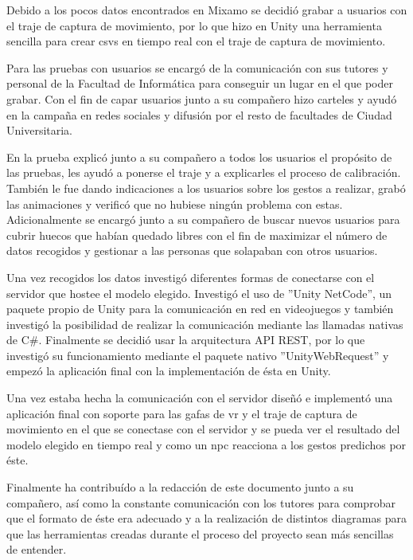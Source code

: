 Debido a los pocos datos encontrados en Mixamo se decidió grabar a usuarios con el traje de captura de movimiento, por lo que hizo en Unity una herramienta sencilla para crear \glspl{csv} en tiempo real con el traje de captura de movimiento.

Para las pruebas con usuarios se encargó de la comunicación con sus tutores y personal de la Facultad de Informática para conseguir un lugar en el que poder grabar.
Con el fin de capar usuarios junto a su compañero hizo carteles y ayudó en la campaña en redes sociales y difusión por el resto de facultades de Ciudad Universitaria.

En la prueba explicó junto a su compañero a todos los usuarios el propósito de las pruebas, les ayudó a ponerse el traje y a explicarles el proceso de calibración.
También le fue dando indicaciones a los usuarios sobre los gestos a realizar, grabó las animaciones y verificó que no hubiese ningún problema con estas.
Adicionalmente se encargó junto a su compañero de buscar nuevos usuarios para cubrir huecos que habían quedado libres con el fin de maximizar el número de datos recogidos y gestionar a las personas que solapaban con otros usuarios.

Una vez recogidos los datos investigó diferentes formas de conectarse con el servidor que hostee el modelo elegido.
Investigó el uso de ''Unity NetCode'', un paquete propio de Unity para la comunicación en red en videojuegos y también investigó la posibilidad de realizar la comunicación mediante las llamadas nativas de C\#.
Finalmente se decidió usar la arquitectura \gls{API REST}, por lo que investigó su funcionamiento mediante el paquete nativo ''UnityWebRequest'' y empezó la aplicación final con la implementación de ésta en Unity.

Una vez estaba hecha la comunicación con el servidor diseñó e implementó una aplicación final con soporte para las gafas de \gls{vr} y el traje de captura de movimiento en el que se conectase con el servidor y se pueda ver el resultado del modelo elegido en tiempo real y como un \gls{npc} reacciona a los gestos predichos por éste.

Finalmente ha contribuído a la redacción de este documento junto a su compañero, así como la constante comunicación con los tutores para comprobar que el formato de éste era adecuado y a la realización de distintos diagramas para que las herramientas creadas durante el proceso del proyecto sean más sencillas de entender.